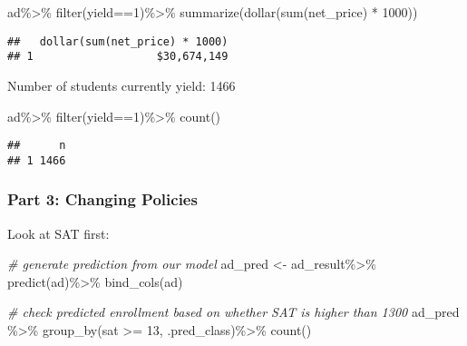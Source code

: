 \documentclass[
]{article}
\newenvironment{Shaded}{\begin{snugshade}}{\end{snugshade}}
\newcommand{\CommentTok}[1]{\textcolor[rgb]{0.56,0.35,0.01}{\textit{#1}}}
\newcommand{\DecValTok}[1]{\textcolor[rgb]{0.00,0.00,0.81}{#1}}
\newcommand{\FunctionTok}[1]{\textcolor[rgb]{0.00,0.00,0.00}{#1}}
\newcommand{\NormalTok}[1]{#1}
\newcommand{\OtherTok}[1]{\textcolor[rgb]{0.56,0.35,0.01}{#1}}
\newcommand{\SpecialCharTok}[1]{\textcolor[rgb]{0.00,0.00,0.00}{#1}}
\begin{document}
\begin{Shaded}
\begin{Highlighting}[]
\NormalTok{ad}\SpecialCharTok{\%\textgreater{}\%}
  \FunctionTok{filter}\NormalTok{(yield}\SpecialCharTok{==}\DecValTok{1}\NormalTok{)}\SpecialCharTok{\%\textgreater{}\%}
  \FunctionTok{summarize}\NormalTok{(}\FunctionTok{dollar}\NormalTok{(}\FunctionTok{sum}\NormalTok{(net\_price) }\SpecialCharTok{*} \DecValTok{1000}\NormalTok{))}
\end{Highlighting}
\end{Shaded}

\begin{verbatim}
##   dollar(sum(net_price) * 1000)
## 1                   $30,674,149
\end{verbatim}

Number of students currently yield: 1466

\begin{Shaded}
\begin{Highlighting}[]
\NormalTok{ad}\SpecialCharTok{\%\textgreater{}\%}
  \FunctionTok{filter}\NormalTok{(yield}\SpecialCharTok{==}\DecValTok{1}\NormalTok{)}\SpecialCharTok{\%\textgreater{}\%}
  \FunctionTok{count}\NormalTok{()}
\end{Highlighting}
\end{Shaded}

\begin{verbatim}
##      n
## 1 1466
\end{verbatim}

\hypertarget{part-3-changing-policies}{%
\subsubsection{Part 3: Changing
Policies}\label{part-3-changing-policies}}

Look at SAT first:

\begin{Shaded}
\begin{Highlighting}[]
\CommentTok{\# generate prediction from our model}
\NormalTok{ad\_pred }\OtherTok{\textless{}{-}}\NormalTok{ ad\_result}\SpecialCharTok{\%\textgreater{}\%}
  \FunctionTok{predict}\NormalTok{(ad)}\SpecialCharTok{\%\textgreater{}\%}
  \FunctionTok{bind\_cols}\NormalTok{(ad)}

\CommentTok{\# check predicted enrollment based on whether SAT is higher than 1300}
\NormalTok{ad\_pred }\SpecialCharTok{\%\textgreater{}\%}
  \FunctionTok{group\_by}\NormalTok{(sat }\SpecialCharTok{\textgreater{}=} \DecValTok{13}\NormalTok{, .pred\_class)}\SpecialCharTok{\%\textgreater{}\%}
  \FunctionTok{count}\NormalTok{()}
\end{Highlighting}
\end{Shaded}
\end{document}
